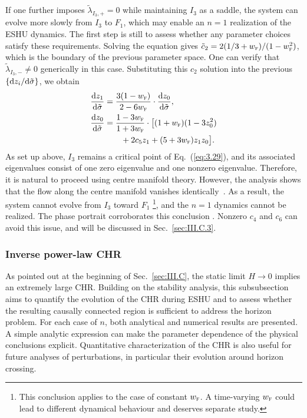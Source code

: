 \documentclass[aps,prd,twocolumn]{revtex4-2}
\newcommand\dx{{\rm d}}
\newcommand\subF{\textsc{f}}
\begin{document}
If one further imposes $\tilde{\lambda}_{I_3,+}=0$ while maintaining $I_3$ as a saddle, the system can evolve more slowly from $I_3$ to $F_1$, which may enable an $n=1$ realization of the ESHU dynamics. The first step is still to assess whether any parameter choices satisfy these requirements. Solving the equation gives $\tilde{c}_2 = 2(1/3+w_\subF)/(1-w_\subF^2)$, which is the boundary of the previous parameter space. One can verify that $\tilde{\lambda}_{I_3,-}\neq0$ generically in this case. Substituting this $c_2$ solution into the previous $\{\dx z_i/\dx\tilde{\sigma}\}$, we obtain
\begin{subequations}\label{eq:3.29}
\begin{align}
  \frac{\dx z_1}{\dx\tilde{\sigma}} &= \frac{3(1-w_\subF)}{2-6w_\subF} \cdot \frac{\dx z_0}{\dx\tilde{\sigma}}, \\
  \frac{\dx z_0}{\dx\tilde{\sigma}} &= \frac{1-3w_\subF}{1+3w_\subF} \cdot \big[ (1+w_\subF)(1-3z_0^2) \nonumber\\
    &\qquad + 2c_5z_1 + (5+3w_\subF)z_1z_0\big].
\end{align}
\end{subequations}
As set up above, $I_3$ remains a critical point of Eq.~(\ref{eq:3.29}), and its associated eigenvalues consist of one zero eigenvalue and one nonzero eigenvalue. Therefore, it is natural to proceed using centre manifold theory. However, the analysis shows that the flow along the centre manifold vanishes identically~\cite{FootnoteEq329}. As a result, the system cannot evolve from $I_3$ toward $F_1$ \footnote{This conclusion applies to the case of constant $w_\subF$. A time-varying $w_\subF$ could lead to different dynamical behaviour and deserves separate study.}, and the $n=1$ dynamics cannot be realized. The phase portrait corroborates this conclusion \cite{NotShown}. Nonzero $c_4$ and $c_6$ can avoid this issue, and will be discussed in Sec.~\ref{sec:III.C.3}.

\subsubsection{Inverse power-law CHR}\label{sec:III.C.2}
As pointed out at the beginning of Sec.~\ref{sec:III.C}, the static limit $H\rightarrow0$ implies an extremely large CHR. Building on the stability analysis, this subsubsection aims to quantify the evolution of the CHR during ESHU and to assess whether the resulting causally connected region is sufficient to address the horizon problem. For each case of $n$, both analytical and numerical results are presented. A simple analytic expression can make the parameter dependence of the physical conclusions explicit. Quantitative characterization of the CHR is also useful for future analyses of perturbations, in particular their evolution around horizon crossing.
\end{document}
